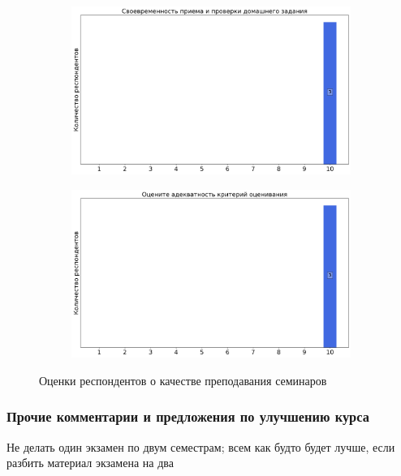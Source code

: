 \begin{figure}[H]
\begin{subfigure}[b]{0.45\textwidth}
                \includegraphics[width=\textwidth]{images/2 course/Дифференциальные уравнения/seminarists-marks-Родин М.М.-2.png}
            \end{subfigure}
            \begin{subfigure}[b]{0.45\textwidth}
                \centering
                \includegraphics[width=\textwidth]{images/2 course/Дифференциальные уравнения/seminarists-marks-Родин М.М.-3.png}
            \end{subfigure}	
            \caption{Оценки респондентов о качестве преподавания семинаров}
        \end{figure}
        

    \subsubsection{Прочие комментарии и предложения по улучшению курса}
        \begin{commentbox}
            Не делать один экзамен по двум семестрам; всем как будто будет лучше, если разбить материал экзамена на два
        \end{commentbox}
